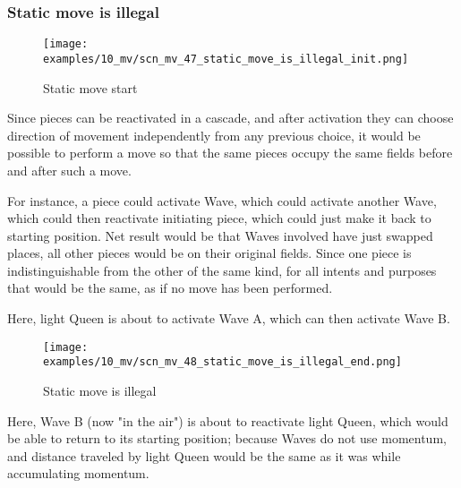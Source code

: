 \subsubsection*{Static move is illegal}
\label{sec:Miranda's veil/Wave/Cascading Waves/Static move is illegal}

\vspace*{-1.4\baselineskip}
\noindent
\begin{figure}[!h]
\texttt{[image: examples/10\_mv/scn\_mv\_47\_static\_move\_is\_illegal\_init.png]}
\vspace*{-1.3\baselineskip}
\caption{Static move start}
\label{fig:scn_mv_47_static_move_is_illegal_init}
\end{figure}

\vspace*{-0.4\baselineskip}
Since pieces can be reactivated in a cascade, and after activation they can choose
direction of movement independently from any previous choice, it would be possible
to perform a move so that the same pieces occupy the same fields before and after
such a move.

For instance, a piece could activate Wave, which could activate another Wave, which
could then reactivate initiating piece, which could just make it back to starting
position. Net result would be that Waves involved have just swapped places, all other
pieces would be on their original fields. Since one piece is indistinguishable from
the other of the same kind, for all intents and purposes that would be the same, as
if no move has been performed.

Here, light Queen is about to activate Wave A, which can then activate Wave B.

\clearpage %

\vspace*{-2.1\baselineskip}
\noindent
\begin{figure}[!h]
\texttt{[image: examples/10\_mv/scn\_mv\_48\_static\_move\_is\_illegal\_end.png]}
\vspace*{-1.3\baselineskip}
\caption{Static move is illegal}
\label{fig:scn_mv_48_static_move_is_illegal_end}
\end{figure}

\vspace*{-0.4\baselineskip}
Here, Wave B (now "in the air") is about to reactivate light Queen, which would be
able to return to its starting position; because Waves do not use momentum, and
distance traveled by light Queen would be the same as it was while accumulating
momentum.

